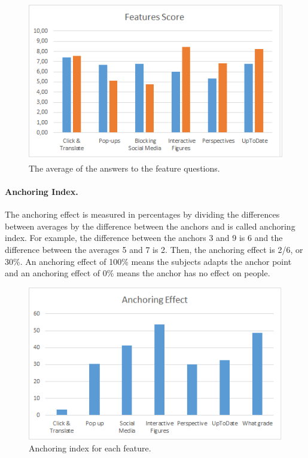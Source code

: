 \documentclass[Main.tex]{subfiles}
\begin{document}
\begin{figure}
\includegraphics[width=\textwidth]{Featerus.png}
\caption{The average of the answers to the feature questions.}
\label{fig:features}
\end{figure}

\paragraph{Anchoring Index.}%
The anchoring effect is measured in percentages by dividing the differences between averages by the difference between the anchors and is called anchoring index. For example, the difference between the anchors 3 and 9 is 6 and the difference between the averages 5 and 7 is 2. Then, the anchoring effect is 2/6, or 30\%. An anchoring effect of 100\% means the subjects adapts the anchor point and an anchoring effect of 0\% means the anchor has no effect on people. 

\begin{figure}
\includegraphics[width=\textwidth]{Anchoringpictures}
\caption{Anchoring index for each feature.}
\label{fig:anchoringIndex}
\end{figure}
\end{document}
